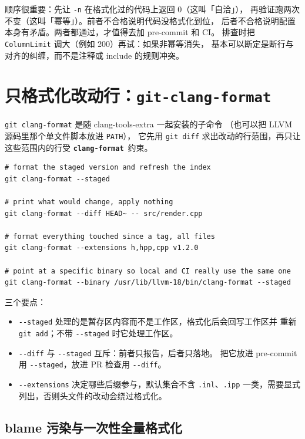 \documentclass[12pt,a4paper,fontset=fandol]{ctexbook}
\newcommand{\Opt}[1]{\texttt{-\/-#1}}
\newcommand{\Lib}[1]{\textbf{\texttt{#1}}}
\newcommand{\Fmt}{\Lib{clang-format}}
\begin{document}
\begin{guideline}[title={把幂等性当成门禁的第一条测试}]
  顺序很重要：先让 \texttt{-n} 在格式化过的代码上返回 0（这叫「自洽」），
  再验证跑两次不变（这叫「幂等」）。前者不合格说明代码没格式化到位，
  后者不合格说明配置本身有矛盾。两者都通过，才值得去加 pre-commit 和 CI。
  排查时把 \texttt{ColumnLimit} 调大（例如 200）再试：如果非幂等消失，
  基本可以断定是断行与对齐的纠缠，而不是注释或 include 的规则冲突。
\end{guideline}

\section{只格式化改动行：\texttt{git-clang-format}}\label{sec:ch10-s3}

\texttt{git clang-format} 是随 clang-tools-extra 一起安装的子命令
（也可以把 LLVM 源码里那个单文件脚本放进 \texttt{PATH}），
它先用 \texttt{git diff} 求出改动的行范围，再只让这些范围内的行受 \Fmt\ 约束。

\begin{lstlisting}[style=shellstyle,caption={增量格式化的三种用法},label={lst:ch10-incremental}]
# format the staged version and refresh the index
git clang-format --staged

# print what would change, apply nothing
git clang-format --diff HEAD~ -- src/render.cpp

# format everything touched since a tag, all files
git clang-format --extensions h,hpp,cpp v1.2.0

# point at a specific binary so local and CI really use the same one
git clang-format --binary /usr/lib/llvm-18/bin/clang-format --staged
\end{lstlisting}

三个要点：

\begin{itemize}
  \item \Opt{staged} 处理的是暂存区内容而不是工作区，格式化后会回写工作区并
    重新 \texttt{git add}；不带 \Opt{staged} 时它处理工作区。
  \item \Opt{diff} 与 \Opt{staged} 互斥：前者只报告，后者只落地。
    把它放进 pre-commit 用 \Opt{staged}，放进 PR 检查用 \Opt{diff}。
  \item \Opt{extensions} 决定哪些后缀参与，默认集合不含 \texttt{.inl}、\texttt{.ipp}
    一类，需要显式列出，否则头文件的改动会绕过格式化。
\end{itemize}

\subsection{blame 污染与一次性全量格式化}\label{sec:ch10-s3-blame}
\end{document}
